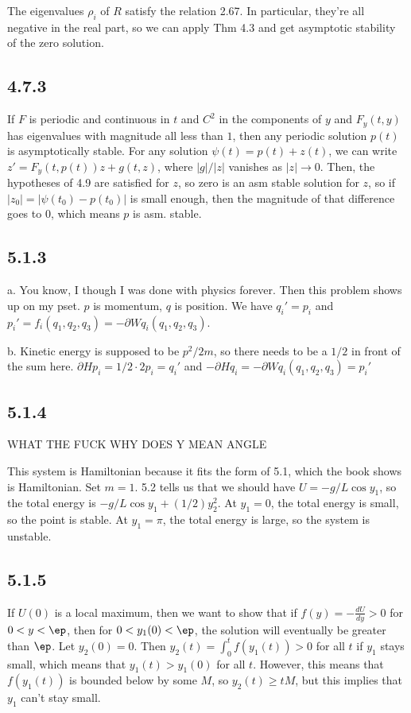 \documentclass{article}
\begin{document}
The eigenvalues $\rho_i$ of $R$ satisfy the relation 2.67. In particular, they're all negative in the real part, so we can apply Thm 4.3 and get asymptotic stability of the zero solution.
\subsection*{4.7.3}
If $F$ is periodic and continuous in $t$ and $C^2$ in the components of $y$ and $F_y(t,y)$ has eigenvalues with magnitude all less than $1$, then any periodic solution $p(t)$ is asymptotically stable. For any solution $\psi(t)=p(t)+z(t)$, we can write $z'=F_y(t,p(t))z+g(t,z)$, where $|g|/|z|$ vanishes as $|z|\to0$. Then, the hypotheses of 4.9 are satisfied for $z$, so zero is an asm stable solution for $z$, so if $|z_0|=|\psi(t_0)-p(t_0)|$ is small enough, then the magnitude of that difference goes to $0$, which means $p$ is asm. stable.
\subsection*{5.1.3}
a. You know, I though I was done with physics forever. Then this problem shows up on my pset. $p$ is momentum, $q$ is position. We have $q_i'=p_i$ and $p_i'=f_i(q_1,q_2,q_3)=-\partial{W}{q_i}(q_1,q_2,q_3)$.

b. Kinetic energy is supposed to be $p^2/2m$, so there needs to be a $1/2$ in front of the sum here. $\partial{H}{p_i}=1/2\cdot2p_i=q_i'$ and $-\partial{H}{q_i}=-\partial{W}{q_i}(q_1,q_2,q_3)=p_i'$
\subsection*{5.1.4}
WHAT THE FUCK WHY DOES Y MEAN ANGLE

This system is Hamiltonian because it fits the form of 5.1, which the book shows is Hamiltonian. Set $m=1$. 5.2 tells us that we should have $U=-g/L\cos y_1$, so the total energy is $-g/L\cos y_1+(1/2)y_2^2$. At $y_1=0$, the total energy is small, so the point is stable. At $y_1=\pi$, the total energy is large, so the system is unstable.
\subsection*{5.1.5}
If $U(0)$ is a local maximum, then we want to show that if $f(y)=-\frac{dU}{dy}>0$ for $0<y<\ep$, then for $0<y_1(0)<\ep$, the solution will eventually be greater than $\ep$. Let $y_2(0)=0$. Then $y_2(t)=\int_0^tf(y_1(t))>0$ for all $t$ if $y_1$ stays small, which means that $y_1(t)>y_1(0)$ for all $t$. However, this means that $f(y_1(t))$ is bounded below by some $M$, so $y_2(t)\geq tM$, but this implies that $y_1$ can't stay small.
\end{document}
